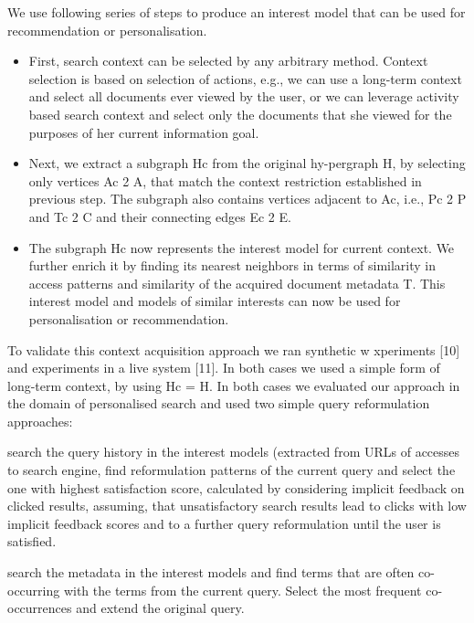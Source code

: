 \documentclass{sig-alternate} %
\begin{document}
We use following series of steps to produce an interest
model that can be used for recommendation or personalisation.

\begin{itemize}
\item First, search context can be selected by any arbitrary
method. Context selection is based on selection of actions, 
e.g., we can use a long-term context and select all
documents ever viewed by the user, or we can leverage
activity based search context and select only the documents 
that she viewed for the purposes of her current
information goal.


\item Next, we extract a subgraph Hc from the original hy-pergraph H, by selecting only vertices Ac 2 A, that match the context restriction established in previous step. The subgraph also contains vertices adjacent to Ac, i.e., Pc 2 P and Tc 2 C and their connecting edges 
Ec 2 E. 

\item The subgraph Hc now represents the interest model
for current context. We further enrich it by finding its
nearest neighbors in terms of similarity in access patterns 
and similarity of the acquired document metadata 
T. This interest model and models of similar
interests can now be used for personalisation or 
recommendation.

\end{itemize}

To validate this context acquisition approach we ran synthetic w
xperiments [10] and experiments in a live system [11].
In both cases we used a simple form of long-term context,
by using Hc = H. In both cases we evaluated our approach
in the domain of personalised search and used two simple
query reformulation approaches:


search the query history in the interest models 
(extracted from URLs of accesses to search engine, find
reformulation patterns of the current query and select 
the one with highest satisfaction score, calculated
by considering implicit feedback on clicked results, assuming, 
that unsatisfactory search results lead to clicks
with low implicit feedback scores and to a further query
reformulation until the user is satisfied.


search the metadata in the interest models and find
terms that are often co-occurring with the terms from
the current query. Select the most frequent co-occurrences 
and extend the original query.
\end{document}
